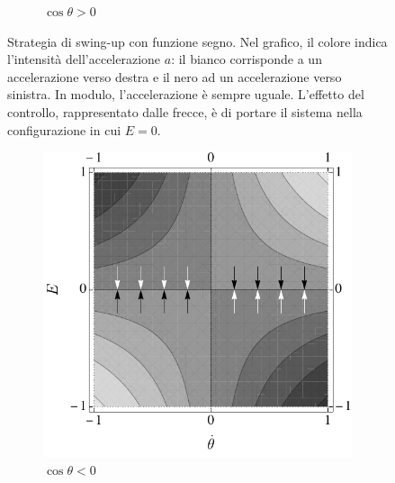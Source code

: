 \begin{figure}
\begin{subfigure}[t]{0.48\textwidth}
        \caption{$\cos\theta > 0$}
    \end{subfigure}
    \caption[Swing-up con funzione segno]{Strategia di swing-up con funzione segno.
    Nel grafico, il colore indica l'intensità dell'accelerazione $a$: il bianco
    corrisponde a un accelerazione verso destra e il nero ad un accelerazione verso sinistra.
    In modulo, l'accelerazione è sempre uguale. L'effetto del controllo, rappresentato dalle frecce, è
    di portare il sistema nella configurazione in cui $E = 0$.}
    \label{fig:energy-control}
\end{figure}

\begin{figure}
    \centering
    \begin{subfigure}[b]{0.48\textwidth}
        \centering
        \includegraphics[width=\textwidth]{assets/energy-control3}
        \caption{$\cos\theta < 0$}
    \end{subfigure}
    \hfill
    \begin{subfigure}[b]{0.48\textwidth}
        \centering

\end{subfigure}
\end{figure}
